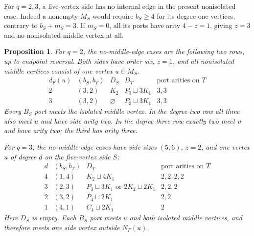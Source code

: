 \documentclass[11pt]{article}
\newtheorem{proposition}[theorem]{Proposition}
\newcommand{\sq}{\sqcup}
\begin{document}
For $q=2,3$, a five-vertex side has no internal edge in the present
nonisolated case. Indeed a nonempty $M_S$ would require
$b_S\geq4$ for its degree-one vertices, contrary to $b_S+m_S=3$.
If $m_S=0$, all its ports have arity $4-z=1$, giving $z=3$ and no
nonisolated middle vertex at all.

\begin{proposition}\label{smallq}
For $q=2$, the no-middle-edge cases are the following two rows, up to
endpoint reversal. Both sides have order six, $z=1$, and all nonisolated
middle vertices consist of one vertex $u\in M_S$.
\[
\begin{array}{c|c|c|c|c}
d_F(u)&(b_S,b_T)&D_S&D_T&\text{port arities on }T\\\hline
2&(3,2)&K_2&P_3\sq3K_1&3,3\\
3&(3,2)&\varnothing&P_3\sq3K_1&3,3
\end{array}
\]
Every $B_S$ port meets the isolated middle vertex. In the degree-two
row all three also meet $u$ and have side arity two. In the degree-three
row exactly two meet $u$ and have arity two; the third has arity three.

For $q=3$, the no-middle-edge cases have side sizes $(5,6)$, $z=2$, and
one vertex $u$ of degree $d$ on the five-vertex side $S$:
\[
\begin{array}{c|c|c|c}
d&(b_S,b_T)&D_T&\text{port arities on }T\\\hline
4&(1,4)&K_2\sq4K_1&2,2,2,2\\
3&(2,3)&P_3\sq3K_1\text{ or }2K_2\sq2K_1&2,2,2\\
2&(3,2)&P_4\sq2K_1&2,2\\
1&(4,1)&C_4\sq2K_1&2
\end{array}
\]
Here $D_S$ is empty. Each $B_S$ port meets $u$ and both isolated middle
vertices, and therefore meets one side vertex outside $N_F(u)$.
\end{proposition}
\end{document}
